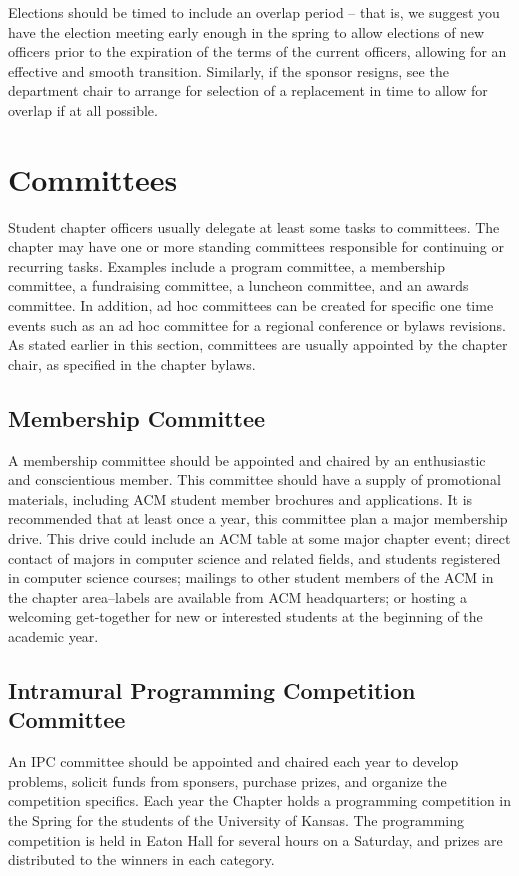 Elections should be timed to include an overlap period -- that is, we suggest you have the election meeting early enough in the spring to allow elections of new officers prior to the expiration of the terms of the current officers, allowing for an effective and smooth transition. Similarly, if the sponsor resigns, see the department chair to arrange for selection of a replacement in time to allow for overlap if at all possible.

\section{Committees}
\label{sec:committees}

Student chapter officers usually delegate at least some tasks to committees. The chapter may have one or more standing committees responsible for continuing or recurring tasks. Examples include a program committee, a membership committee, a fundraising committee, a luncheon committee, and an awards committee. In addition, ad hoc committees can be created for specific one time events such as an ad hoc committee for a regional conference or bylaws revisions. As stated earlier in this section, committees are usually appointed by the chapter chair, as specified in the chapter bylaws.

\subsection*{Membership Committee}
A membership committee should be appointed and chaired by an enthusiastic and conscientious member. This committee should have a supply of promotional materials, including ACM student member brochures and applications. It is recommended that at least once a year, this committee plan a major membership drive. This drive could include an ACM table at some major chapter event; direct contact of majors in computer science and related fields, and students registered in computer science courses; mailings to other student members of the ACM in the chapter area--labels are available from ACM headquarters; or hosting a welcoming get-together for new or interested students at the beginning of the academic year.
\subsection*{Intramural Programming Competition Committee}
An IPC committee should be appointed and chaired each year to develop problems, solicit funds from sponsers, purchase prizes, and organize the competition specifics. Each year the Chapter holds a programming competition in the Spring for the students of the University of Kansas. The programming competition is held in Eaton Hall for several hours on a Saturday, and prizes are distributed to the winners in each category.

